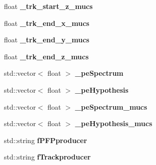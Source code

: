 \begin{DoxyCompactItemize}
\item 
\hypertarget{classMuCSFlashMatch_a757af18fa31ba2da2099023c4af05438}{float {\bfseries \-\_\-trk\-\_\-start\-\_\-z\-\_\-mucs}}\label{classMuCSFlashMatch_a757af18fa31ba2da2099023c4af05438}

\item 
\hypertarget{classMuCSFlashMatch_ab8bf9c0a1e791631716ffa579e51a2b0}{float {\bfseries \-\_\-trk\-\_\-end\-\_\-x\-\_\-mucs}}\label{classMuCSFlashMatch_ab8bf9c0a1e791631716ffa579e51a2b0}

\item 
\hypertarget{classMuCSFlashMatch_a6ed4d1d6e27847f17a9536d60cfa849d}{float {\bfseries \-\_\-trk\-\_\-end\-\_\-y\-\_\-mucs}}\label{classMuCSFlashMatch_a6ed4d1d6e27847f17a9536d60cfa849d}

\item 
\hypertarget{classMuCSFlashMatch_a23578eeaa8612076197aea04428a7485}{float {\bfseries \-\_\-trk\-\_\-end\-\_\-z\-\_\-mucs}}\label{classMuCSFlashMatch_a23578eeaa8612076197aea04428a7485}

\item 
\hypertarget{classMuCSFlashMatch_a0f842c11463fffdab3be14c17853185e}{std\-::vector$<$ float $>$ {\bfseries \-\_\-pe\-Spectrum}}\label{classMuCSFlashMatch_a0f842c11463fffdab3be14c17853185e}

\item 
\hypertarget{classMuCSFlashMatch_ac4220bb90ad9debcc818b8273f0fb6c6}{std\-::vector$<$ float $>$ {\bfseries \-\_\-pe\-Hypothesis}}\label{classMuCSFlashMatch_ac4220bb90ad9debcc818b8273f0fb6c6}

\item 
\hypertarget{classMuCSFlashMatch_a7976b1923f812d693d90d8483fc275a3}{std\-::vector$<$ float $>$ {\bfseries \-\_\-pe\-Spectrum\-\_\-mucs}}\label{classMuCSFlashMatch_a7976b1923f812d693d90d8483fc275a3}

\item 
\hypertarget{classMuCSFlashMatch_a41563fc0fde7d884bc82a5843b4bbacb}{std\-::vector$<$ float $>$ {\bfseries \-\_\-pe\-Hypothesis\-\_\-mucs}}\label{classMuCSFlashMatch_a41563fc0fde7d884bc82a5843b4bbacb}

\item 
\hypertarget{classMuCSFlashMatch_a633ec89d3a0296320809bbb81be8cbd8}{std\-::string {\bfseries f\-P\-F\-Pproducer}}\label{classMuCSFlashMatch_a633ec89d3a0296320809bbb81be8cbd8}

\item 
\hypertarget{classMuCSFlashMatch_a2c3c957fd102a157d26b853ba9507058}{std\-::string {\bfseries f\-Trackproducer}}\label{classMuCSFlashMatch_a2c3c957fd102a157d26b853ba9507058}


\end{DoxyCompactItemize}
